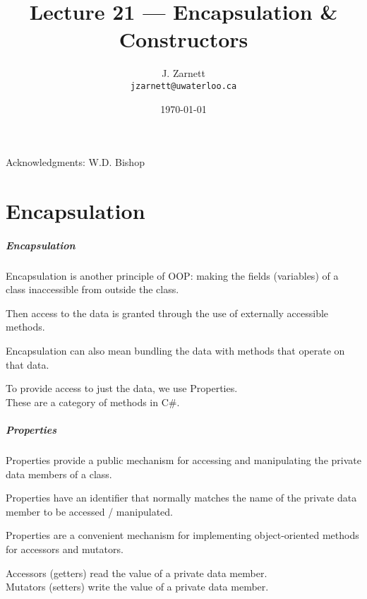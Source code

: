 

\title{Lecture 21 --- Encapsulation \& Constructors}

\author{J. Zarnett\\
\texttt{jzarnett@uwaterloo.ca}}
\date{\today}



\begin{frame}
  \titlepage
  
  \begin{center}
  \small{Acknowledgments: W.D. Bishop}
  \end{center}
\end{frame}

\part{Encapsulation}
\begin{frame}\partpage\end{frame}

\begin{frame}
\frametitle{Encapsulation}
\alert{Encapsulation} is another principle of OOP: making the fields (variables) of a class inaccessible from outside the class.

Then access to the data is granted through the use of externally accessible methods.

Encapsulation can also mean bundling the data with methods that operate on that data.

To provide access to just the data, we use \alert{Properties}.\\
\quad These are a category of methods in C\#.

\end{frame}


\begin{frame}
\frametitle{Properties}

Properties provide a public mechanism for accessing and manipulating the private data members of a class.

Properties have an identifier that normally matches the name of the private data member to be accessed / manipulated.

Properties are a convenient mechanism for implementing object-oriented methods for accessors and mutators.

\alert{Accessors} (getters) read the value of a private data member.\\
\alert{Mutators} (setters) write the value of a private data member.

\end{frame}

